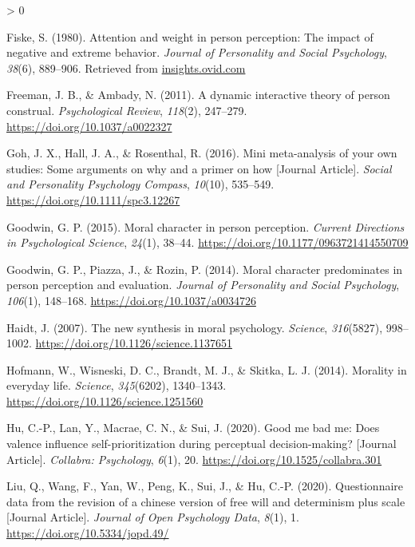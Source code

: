 \documentclass[
  english,
  man]{apa6}
\newlength{\cslhangindent}
\newenvironment{CSLReferences}[2] %
 {%
  \setlength{\parindent}{0pt}
  \ifodd #1 \everypar{\setlength{\hangindent}{\cslhangindent}}\ignorespaces\fi
  \ifnum #2 > 0
  \setlength{\parskip}{#2\baselineskip}
  \fi
 }%
 {}
\begin{document}
\begin{CSLReferences}{1}{0}
\leavevmode\hypertarget{ref-fiske_attention_1980}{}%
Fiske, S. (1980). Attention and weight in person perception: The impact of negative and extreme behavior. \emph{Journal of Personality and Social Psychology}, \emph{38}(6), 889--906. Retrieved from \href{https://insights.ovid.com}{insights.ovid.com}

\leavevmode\hypertarget{ref-freeman_dynamic_2011}{}%
Freeman, J. B., \& Ambady, N. (2011). A dynamic interactive theory of person construal. \emph{Psychological Review}, \emph{118}(2), 247--279. \url{https://doi.org/10.1037/a0022327}

\leavevmode\hypertarget{ref-Goh_2016_mini}{}%
Goh, J. X., Hall, J. A., \& Rosenthal, R. (2016). Mini meta-analysis of your own studies: Some arguments on why and a primer on how {[}Journal Article{]}. \emph{Social and Personality Psychology Compass}, \emph{10}(10), 535--549. \url{https://doi.org/10.1111/spc3.12267}

\leavevmode\hypertarget{ref-goodwin_moral_2015}{}%
Goodwin, G. P. (2015). Moral character in person perception. \emph{Current Directions in Psychological Science}, \emph{24}(1), 38--44. \url{https://doi.org/10.1177/0963721414550709}

\leavevmode\hypertarget{ref-goodwin_moral_2014}{}%
Goodwin, G. P., Piazza, J., \& Rozin, P. (2014). Moral character predominates in person perception and evaluation. \emph{Journal of Personality and Social Psychology}, \emph{106}(1), 148--168. \url{https://doi.org/10.1037/a0034726}

\leavevmode\hypertarget{ref-haidt_new_2007}{}%
Haidt, J. (2007). The new synthesis in moral psychology. \emph{Science}, \emph{316}(5827), 998--1002. \url{https://doi.org/10.1126/science.1137651}

\leavevmode\hypertarget{ref-hofmann_morality_2014}{}%
Hofmann, W., Wisneski, D. C., Brandt, M. J., \& Skitka, L. J. (2014). Morality in everyday life. \emph{Science}, \emph{345}(6202), 1340--1343. \url{https://doi.org/10.1126/science.1251560}

\leavevmode\hypertarget{ref-Hu_2020_GoodSelf}{}%
Hu, C.-P., Lan, Y., Macrae, C. N., \& Sui, J. (2020). Good me bad me: Does valence influence self-prioritization during perceptual decision-making? {[}Journal Article{]}. \emph{Collabra: Psychology}, \emph{6}(1), 20. \url{https://doi.org/10.1525/collabra.301}

\leavevmode\hypertarget{ref-Liu_2020_JOPD}{}%
Liu, Q., Wang, F., Yan, W., Peng, K., Sui, J., \& Hu, C.-P. (2020). Questionnaire data from the revision of a chinese version of free will and determinism plus scale {[}Journal Article{]}. \emph{Journal of Open Psychology Data}, \emph{8}(1), 1. \url{https://doi.org/10.5334/jopd.49/}


\end{CSLReferences}
\end{document}
